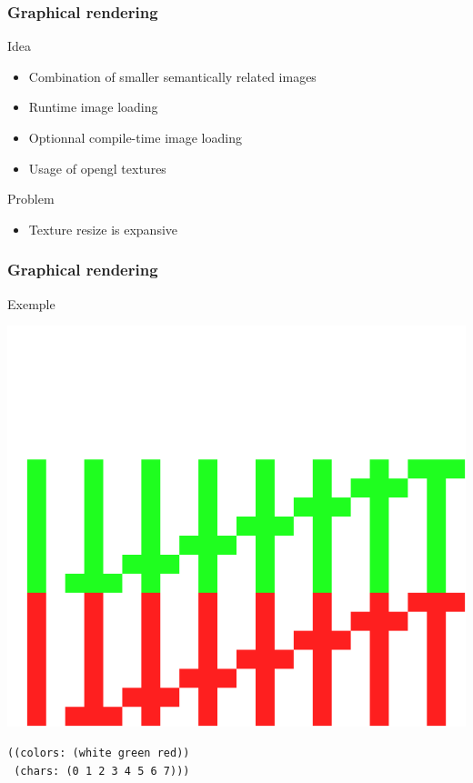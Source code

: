 \documentclass{beamer}
\newcommand{\<}[1]{\`#1}
\begin{document}
\begin{frame}
  \frametitle{Graphical rendering}
  \begin{block}{Idea}
    \begin{itemize}
    \item Combination of smaller semantically related images
    \item Runtime image loading
    \item Optionnal compile-time image loading
    \item Usage of opengl textures
    \end{itemize}
  \end{block}
  
  \begin{block}{Problem}
    \begin{itemize}
    \item Texture resize is expansive
    \end{itemize}
  \end{block}
\end{frame}

\begin{frame}[fragile]
  \frametitle{Graphical rendering}

  \begin{block}{Exemple}
    \begin{center}
      \includegraphics[scale=0.2]{font-exemple}
    \end{center}
    \begin{lstlisting}[basicstyle=\footnotesize]
((colors: (white green red))
 (chars: (0 1 2 3 4 5 6 7)))
    \end{lstlisting}
  \end{block}
\end{frame}
\end{document}
